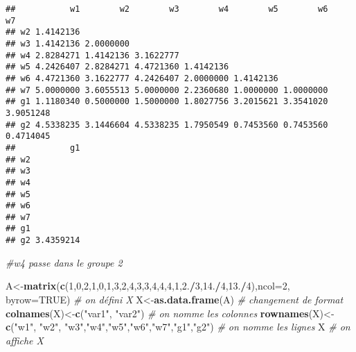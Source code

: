 \documentclass[
]{article}
\newenvironment{Shaded}{\begin{snugshade}}{\end{snugshade}}
\newcommand{\CommentTok}[1]{\textcolor[rgb]{0.56,0.35,0.01}{\textit{#1}}}
\newcommand{\DataTypeTok}[1]{\textcolor[rgb]{0.13,0.29,0.53}{#1}}
\newcommand{\DecValTok}[1]{\textcolor[rgb]{0.00,0.00,0.81}{#1}}
\newcommand{\FloatTok}[1]{\textcolor[rgb]{0.00,0.00,0.81}{#1}}
\newcommand{\KeywordTok}[1]{\textcolor[rgb]{0.13,0.29,0.53}{\textbf{#1}}}
\newcommand{\NormalTok}[1]{#1}
\newcommand{\OperatorTok}[1]{\textcolor[rgb]{0.81,0.36,0.00}{\textbf{#1}}}
\newcommand{\OtherTok}[1]{\textcolor[rgb]{0.56,0.35,0.01}{#1}}
\newcommand{\StringTok}[1]{\textcolor[rgb]{0.31,0.60,0.02}{#1}}
\begin{document}
\begin{verbatim}
##           w1        w2        w3        w4        w5        w6        w7
## w2 1.4142136                                                            
## w3 1.4142136 2.0000000                                                  
## w4 2.8284271 1.4142136 3.1622777                                        
## w5 4.2426407 2.8284271 4.4721360 1.4142136                              
## w6 4.4721360 3.1622777 4.2426407 2.0000000 1.4142136                    
## w7 5.0000000 3.6055513 5.0000000 2.2360680 1.0000000 1.0000000          
## g1 1.1180340 0.5000000 1.5000000 1.8027756 3.2015621 3.3541020 3.9051248
## g2 4.5338235 3.1446604 4.5338235 1.7950549 0.7453560 0.7453560 0.4714045
##           g1
## w2          
## w3          
## w4          
## w5          
## w6          
## w7          
## g1          
## g2 3.4359214
\end{verbatim}

\begin{Shaded}
\begin{Highlighting}[]
\CommentTok{#w4 passe dans le groupe 2}

\NormalTok{A<-}\KeywordTok{matrix}\NormalTok{(}\KeywordTok{c}\NormalTok{(}\DecValTok{1}\NormalTok{,}\DecValTok{0}\NormalTok{,}\DecValTok{2}\NormalTok{,}\DecValTok{1}\NormalTok{,}\DecValTok{0}\NormalTok{,}\DecValTok{1}\NormalTok{,}\DecValTok{3}\NormalTok{,}\DecValTok{2}\NormalTok{,}\DecValTok{4}\NormalTok{,}\DecValTok{3}\NormalTok{,}\DecValTok{3}\NormalTok{,}\DecValTok{4}\NormalTok{,}\DecValTok{4}\NormalTok{,}\DecValTok{4}\NormalTok{,}\DecValTok{1}\NormalTok{,}\FloatTok{2.}\OperatorTok{/}\DecValTok{3}\NormalTok{,}\FloatTok{14.}\OperatorTok{/}\DecValTok{4}\NormalTok{,}\FloatTok{13.}\OperatorTok{/}\DecValTok{4}\NormalTok{),}\DataTypeTok{ncol=}\DecValTok{2}\NormalTok{, }\DataTypeTok{byrow=}\OtherTok{TRUE}\NormalTok{) }\CommentTok{# on défini X}
\NormalTok{X<-}\KeywordTok{as.data.frame}\NormalTok{(A) }\CommentTok{# changement de format}
\KeywordTok{colnames}\NormalTok{(X)<-}\KeywordTok{c}\NormalTok{(}\StringTok{"var1"}\NormalTok{, }\StringTok{"var2"}\NormalTok{) }\CommentTok{# on nomme les colonnes}
\KeywordTok{rownames}\NormalTok{(X)<-}\KeywordTok{c}\NormalTok{(}\StringTok{"w1"}\NormalTok{, }\StringTok{"w2"}\NormalTok{, }\StringTok{"w3"}\NormalTok{,}\StringTok{"w4"}\NormalTok{,}\StringTok{"w5"}\NormalTok{,}\StringTok{"w6"}\NormalTok{,}\StringTok{"w7"}\NormalTok{,}\StringTok{"g1"}\NormalTok{,}\StringTok{"g2"}\NormalTok{) }\CommentTok{# on nomme les lignes}
\NormalTok{X }\CommentTok{# on affiche X}
\end{Highlighting}
\end{Shaded}
\end{document}
